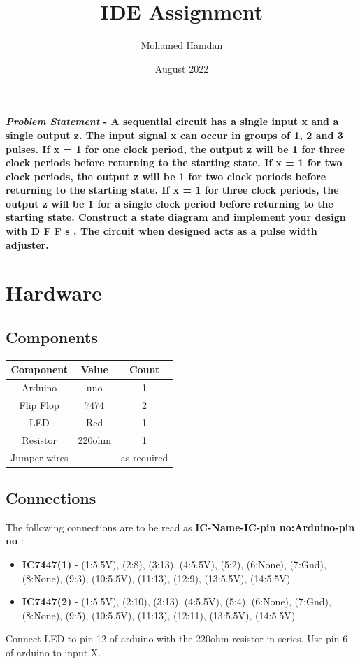 \documentclass[journal,10pt,twocolumn]{article}
\title{\textbf{IDE Assignment}}
\author{Mohamed Hamdan}
\date{August 2022}
\begin{document}
\maketitle
\paragraph{\textit{Problem Statement} - A sequential circuit has a single input x and a single output z. The input signal x can occur in groups of 1, 2 and 3 pulses. If x = 1 for one clock period, the output z will be 1 for three clock periods before returning to the starting state. If x = 1 for two clock periods, the output z will be 1 for two clock periods before returning to the starting state. If x = 1 for three clock periods, the output z will be 1 for a single clock period before returning to the starting state. Construct a state diagram and implement your design with D F F s . The circuit when designed acts as a pulse width adjuster.
}

\section*{\large Hardware}
\subsection*{\normalsize Components}
{
\centering
\begin{tabular}{|c|c|c|}
\hline
Component&Value&Count\\
\hline
Arduino&uno&1\\
\hline
Flip Flop&7474&2\\
\hline
LED&Red&1\\
\hline
Resistor&220ohm&1\\
\hline
Jumper wires&-&as required\\
\hline
\end{tabular}\par
}
\subsection*{\normalsize Connections}
The following connections are to be read as \textbf{IC-Name-IC-pin no:Arduino-pin no} :
\begin{itemize}
\item \textbf{IC7447(1)} - (1:5.5V), (2:8), (3:13), (4:5.5V), (5:2), (6:None), (7:Gnd), (8:None), (9:3), (10:5.5V), (11:13), (12:9), (13:5.5V), (14:5.5V)
\item \textbf{IC7447(2)} - (1:5.5V), (2:10), (3:13), (4:5.5V), (5:4), (6:None), (7:Gnd), (8:None), (9:5), (10:5.5V), (11:13), (12:11), (13:5.5V), 
 (14:5.5V)
\end{itemize}
Connect LED to pin 12 of arduino with the 220ohm resistor in series. Use pin 6 of arduino to input X.
\end{document}
